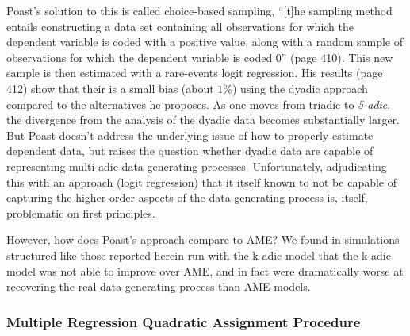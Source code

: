 Poast's solution to this is called choice-based sampling, ``[t]he sampling method entails constructing a data set containing all observations for which the dependent variable is coded with a positive value, along with a random sample of observations for which the dependent variable is coded 0'' (page 410). This new sample is then estimated with a rare-events logit regression. His results (page 412) show that their is a small bias (about $1\%$) using the dyadic approach compared to the alternatives he proposes.  As one moves from triadic to \textit{5-adic}, the divergence from the analysis of the dyadic data becomes substantially larger. But Poast doesn't address the underlying issue of how to properly estimate dependent data, but raises the question whether dyadic data are capable of representing multi-adic data generating processes.  Unfortunately, adjudicating this with an approach (logit regression) that it itself known to not be capable of capturing the higher-order aspects of the data generating process is, itself, problematic on first principles.  

However, how does Poast's approach compare to AME? We found in simulations structured like those reported herein run with the k-adic model that the k-adic model was not able to improve over AME, and in fact were dramatically worse at recovering the real data generating process than AME models. 


\subsubsection*{Multiple Regression Quadratic Assignment Procedure}

